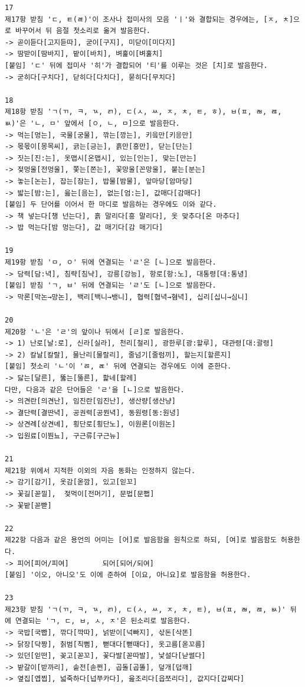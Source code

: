 \documentclass[letterpaper]{article} %
\begin{document}
\begin{verbatim}
17
제17항 받침 'ㄷ, ㅌ(ㄾ)'이 조사나 접미사의 모음 'ㅣ'와 결합되는 경우에는, [ㅈ, ㅊ]으로 바꾸어서 뒤 음절 첫소리로 옮겨 발음한다.
-> 곧이듣다[고지듣따], 굳이[구지], 미닫이[미다지]
-> 땀받이[땀바지], 밭이[바치], 벼훑이[벼훌치]
[붙임] 'ㄷ' 뒤에 접미사 '히'가 결합되어 '티'를 이루는 것은 [치]로 발음한다.
-> 굳히다[구치다], 닫히다[다치다], 묻히다[무치다]

18
제18항 받침 'ㄱ(ㄲ, ㅋ, ㄳ, ㄺ), ㄷ(ㅅ, ㅆ, ㅈ, ㅊ, ㅌ, ㅎ), ㅂ(ㅍ, ㄼ, ㄿ, ㅄ)'은 'ㄴ, ㅁ' 앞에서 [ㅇ, ㄴ, ㅁ]으로 발음한다.
-> 먹는[멍는], 국물[궁물], 깎는[깡는], 키읔만[키응만]
-> 몫몫이[몽목씨], 긁는[긍는], 흙만[흥만], 닫는[단는]
-> 짓는[진:는], 옷맵시[온맵시], 있는[인는], 맞는[만는]
-> 젖멍울[전멍울], 쫓는[쫀는], 꽃망울[꼰망울], 붙는[분는]
-> 놓는[논는], 잡는[잠는], 밥물[밤물], 앞마당[암마당]
-> 밟는[밤:는], 읊는[음는], 없는[엄:는], 값매다[감매다]
[붙임] 두 단어를 이어서 한 마디로 발음하는 경우에도 이와 같다.
-> 책 넣는다[챙 넌는다], 흙 말리다[흥 말리다], 옷 맞추다[온 마추다]
-> 밥 먹는다[밤 멍는다], 값 매기다[감 매기다]

19
제19항 받침 'ㅁ, ㅇ' 뒤에 연결되는 'ㄹ'은 [ㄴ]으로 발음한다.
-> 담력[담:녁], 침략[침냑], 강릉[강능], 항로[항:노], 대통령[대:통녕]
[붙임] 받침 'ㄱ, ㅂ' 뒤에 연결되는 'ㄹ'도 [ㄴ]으로 발음한다.
-> 막론[막논→망논], 백리[백니→뱅니], 협력[협녁→혐녁], 십리[십니→심니]

20
제20항 'ㄴ'은 'ㄹ'의 앞이나 뒤에서 [ㄹ]로 발음한다.
-> 1) 난로[날:로], 신라[실라], 천리[철리], 광한루[광:할루], 대관령[대:괄령]
-> 2) 칼날[칼랄], 물난리[물랄리], 줄넘기[줄럼끼], 할는지[할른지]
[붙임] 첫소리 'ㄴ'이 'ㅀ, ㄾ' 뒤에 연결되는 경우에도 이에 준한다.
-> 닳는[달른], 뚫는[뚤른], 핥네[할레]
다만, 다음과 같은 단어들은 'ㄹ'을 [ㄴ]으로 발음한다.
-> 의견란[의견난], 임진란[임진난], 생산량[생산냥]
-> 결단력[결딴녁], 공권력[공꿘녁], 동원령[동:원녕]
-> 상견례[상견녜], 횡단로[횡단노], 이원론[이원논]
-> 입원료[이붠뇨], 구근류[구근뉴]

21
제21항 위에서 지적한 이외의 자음 동화는 인정하지 않는다.
-> 감기[감기], 옷감[옫깜], 있고[읻꼬]
-> 꽃길[꼳낄],	젖먹이[전머기], 문법[문뻡]
-> 꽃밭[꼳빧]

22
제22항 다음과 같은 용언의 어미는 [어]로 발음함을 원칙으로 하되, [여]로 발음함도 허용한다.
-> 피어[피어/피여] 		되어[되어/되여]
[붙임] '이오, 아니오'도 이에 준하여 [이요, 아니요]로 발음함을 허용한다.

23
제23항 받침 'ㄱ(ㄲ, ㅋ, ㄳ, ㄺ), ㄷ(ㅅ, ㅆ, ㅈ, ㅊ, ㅌ), ㅂ(ㅍ, ㄼ, ㄿ, ㅄ)' 뒤에 연결되는 'ㄱ, ㄷ, ㅂ, ㅅ, ㅈ'은 된소리로 발음한다.
-> 국밥[국빱], 깎다[깍따], 넑받이[넉빠지], 삯돈[삭똔]
-> 닭장[닥짱], 칡범[칙뻠], 뻗대다[뻗때다], 옷고름[옫꼬름]
-> 있던[읻떤], 꽂고[꼳꼬], 꽃다발[꼳따발], 낯설다[낟썰다]
-> 밭갈이[받까리], 솥전[솓쩐], 곱돌[곱똘], 덮개[덥깨]
-> 옆집[엽찝], 넓죽하다[넙쭈카다], 읊조리다[읍쪼리다], 값지다[갑찌다]


\end{verbatim}
\end{document}
